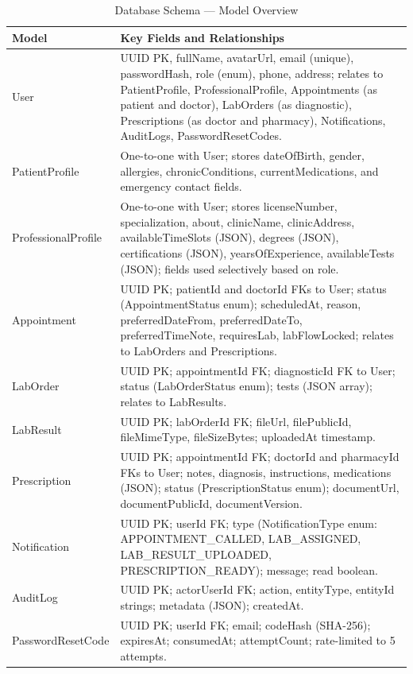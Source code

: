 \documentclass[12pt,a4paper]{report}
\begin{document}
\begin{table}[tbp]
\caption{Database Schema --- Model Overview}
\label{tab:schema}
\centering
\begin{tabular}{|p{3.2cm}|p{9cm}|}
\hline
\textbf{Model} & \textbf{Key Fields and Relationships}\\
\hline
User               & UUID PK, fullName, avatarUrl, email (unique), passwordHash, role (enum), phone, address; relates to PatientProfile, ProfessionalProfile, Appointments (as patient and doctor), LabOrders (as diagnostic), Prescriptions (as doctor and pharmacy), Notifications, AuditLogs, PasswordResetCodes.\\
\hline
PatientProfile     & One-to-one with User; stores dateOfBirth, gender, allergies, chronicConditions, currentMedications, and emergency contact fields.\\
\hline
ProfessionalProfile & One-to-one with User; stores licenseNumber, specialization, about, clinicName, clinicAddress, availableTimeSlots (JSON), degrees (JSON), certifications (JSON), yearsOfExperience, availableTests (JSON); fields used selectively based on role.\\
\hline
Appointment        & UUID PK; patientId and doctorId FKs to User; status (AppointmentStatus enum); scheduledAt, reason, preferredDateFrom, preferredDateTo, preferredTimeNote, requiresLab, labFlowLocked; relates to LabOrders and Prescriptions.\\
\hline
LabOrder           & UUID PK; appointmentId FK; diagnosticId FK to User; status (LabOrderStatus enum); tests (JSON array); relates to LabResults.\\
\hline
LabResult          & UUID PK; labOrderId FK; fileUrl, filePublicId, fileMimeType, fileSizeBytes; uploadedAt timestamp.\\
\hline
Prescription       & UUID PK; appointmentId FK; doctorId and pharmacyId FKs to User; notes, diagnosis, instructions, medications (JSON); status (PrescriptionStatus enum); documentUrl, documentPublicId, documentVersion.\\
\hline
Notification       & UUID PK; userId FK; type (NotificationType enum: APPOINTMENT\_CALLED, LAB\_ASSIGNED, LAB\_RESULT\_UPLOADED, PRESCRIPTION\_READY); message; read boolean.\\
\hline
AuditLog           & UUID PK; actorUserId FK; action, entityType, entityId strings; metadata (JSON); createdAt.\\
\hline
PasswordResetCode  & UUID PK; userId FK; email; codeHash (SHA-256); expiresAt; consumedAt; attemptCount; rate-limited to 5 attempts.\\
\hline
\end{tabular}
\end{table}
\end{document}
